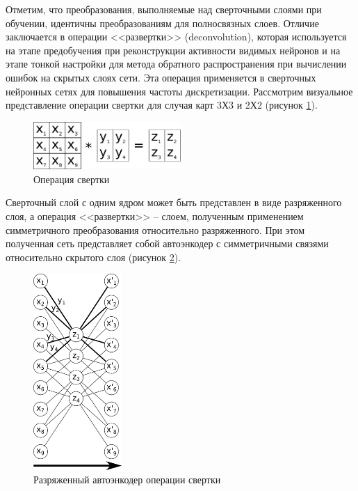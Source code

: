 Отметим, что преобразования, выполняемые над сверточными слоями при обучении, идентичны преобразованиям для полносвязных слоев. 
Отличие заключается в операции <<развертки>> (deconvolution), которая используется на этапе предобучения при реконструкции активности видимых нейронов и на этапе тонкой настройки для метода обратного распространения при вычислении ошибок на скрытых слоях сети. Эта операция применяется в сверточных нейронных сетях для повышения частоты дискретизации.
Рассмотрим визуальное представление операции свертки для случая карт 3Х3 и 2Х2 (рисунок \ref{fig:convolution}).

\begin{figure}[H]
  \centering
  \includegraphics[width=0.5\textwidth]{man-source/images/ch2/pic2-4.png}
  \caption{Операция свертки}
  \label{fig:convolution}
\end{figure}

Сверточный слой с одним ядром может быть представлен в виде разряженного слоя, а операция <<развертки>> -- слоем, полученным применением симметричного преобразования относительно разряженного. При этом полученная сеть представляет собой автоэнкодер с симметричными связями относительно скрытого слоя (рисунок \ref{fig:convolution_autoencoder}).

\begin{figure}[H]
  \centering
  \includegraphics[width=0.3\textwidth]{man-source/images/ch2/pic2-5.png}
  \caption{Разряженный автоэнкодер операции свертки}
  \label{fig:convolution_autoencoder}
\end{figure}


